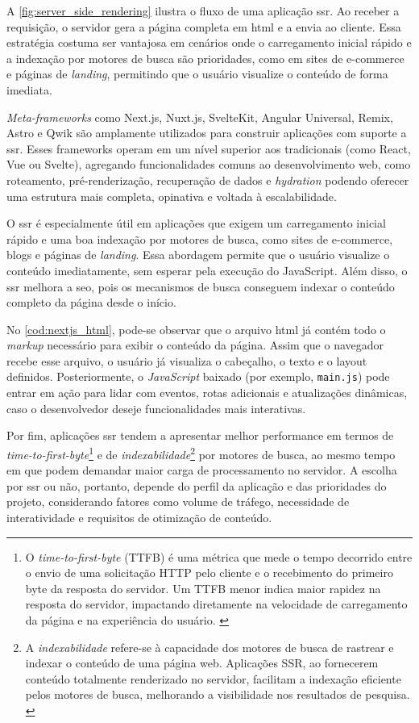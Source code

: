 A \autoref{fig:server_side_rendering} ilustra o fluxo de uma aplicação \acrshort{ssr}. Ao receber a requisição, o servidor gera a página completa em \acrshort{html} e a envia ao cliente. Essa estratégia costuma ser vantajosa em cenários onde o carregamento inicial rápido e a indexação por motores de busca são prioridades, como em sites de e-commerce e páginas de \emph{landing}, permitindo que o usuário visualize o conteúdo de forma imediata. 

\emph{Meta-frameworks} como Next.js, Nuxt.js, SvelteKit, Angular Universal, Remix, Astro e Qwik são amplamente utilizados para construir aplicações com suporte a \acrshort{ssr}. Esses frameworks operam em um nível superior aos tradicionais (como React, Vue ou Svelte), agregando funcionalidades comuns ao desenvolvimento web, como roteamento, pré-renderização, recuperação de dados e \emph{hydration} podendo oferecer uma estrutura mais completa, opinativa e voltada à escalabilidade.

O \acrshort{ssr} é especialmente útil em aplicações que exigem um carregamento inicial rápido e uma boa indexação por motores de busca, como sites de e-commerce, blogs e páginas de \emph{landing}. Essa abordagem permite que o usuário visualize o conteúdo imediatamente, sem esperar pela execução do JavaScript. Além disso, o \acrshort{ssr} melhora a \acrshort{seo}, pois os mecanismos de busca conseguem indexar o conteúdo completo da página desde o início.

No \autoref{cod:nextjs_html}, pode-se observar que o arquivo \acrshort{html} já contém todo o \emph{markup} necessário para exibir o conteúdo da página. Assim que o navegador recebe esse arquivo, o usuário já visualiza o cabeçalho, o texto e o layout definidos. Posteriormente, o \emph{JavaScript} baixado (por exemplo, \texttt{main.js}) pode entrar em ação para lidar com eventos, rotas adicionais e atualizações dinâmicas, caso o desenvolvedor deseje funcionalidades mais interativas.

Por fim, aplicações \acrshort{ssr} tendem a apresentar melhor performance em termos de \emph{time-to-first-byte}\footnote{O \emph{time-to-first-byte} (TTFB) é uma métrica que mede o tempo decorrido entre o envio de uma solicitação HTTP pelo cliente e o recebimento do primeiro byte da resposta do servidor. Um TTFB menor indica maior rapidez na resposta do servidor, impactando diretamente na velocidade de carregamento da página e na experiência do usuário. \cite{ttfb-craig}} e de \emph{indexabilidade}\footnote{A \emph{indexabilidade} refere-se à capacidade dos motores de busca de rastrear e indexar o conteúdo de uma página web. Aplicações SSR, ao fornecerem conteúdo totalmente renderizado no servidor, facilitam a indexação eficiente pelos motores de busca, melhorando a visibilidade nos resultados de pesquisa. \cite{ttfb-oskay}} por motores de busca, ao mesmo tempo em que podem demandar maior carga de processamento no servidor. A escolha por \acrshort{ssr} ou não, portanto, depende do perfil da aplicação e das prioridades do projeto, considerando fatores como volume de tráfego, necessidade de interatividade e requisitos de otimização de conteúdo.

